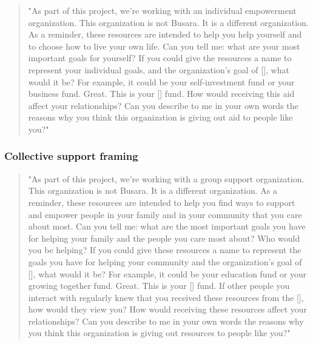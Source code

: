 \documentclass[11pt, a4paper]{article}\usepackage[]{graphicx}\usepackage[]{color}
\begin{document}
            \begin{quote}

                "As part of this project, we're working with an individual empowerment organization. This organization is not Busara. It is a different organization.
                As a reminder, these resources are intended to help you help yourself and to choose how to live your own life.
                Can you tell me: what are your most important goals for yourself?
                If you could give the resources a name to represent your individual goals, and the organization's goal of [], what would it be?  For example, it could be your self-investment fund or your business fund.
                Great. This is your [] fund.
                How would receiving this aid affect your relationships?
                Can you describe to me in your own words the reasons why you think this organization is giving out aid to people like you?"

            \end{quote}

        \subsubsection{Collective support framing}

            \begin{quote}

                "As part of this project, we're working with a group support organization. This organization is not Busara. It is a different organization.
                As a reminder, these resources are intended to help you find ways to support and empower people in your family and in your community that you care about most.
                Can you tell me: what are the most important goals you have for helping your family and the people you care most about? Who would you be helping?
                If you could give these resources a name to represent the goals you have for helping your community and the organization's goal of [], what would it be? For example, it could be your education fund or your growing together fund.
                Great. This is your [] fund.
                If other people you interact with regularly knew that you received these resources from the [], how would they view you?
                How would receiving these resources affect your relationships?
                Can you describe to me in your own words the reasons why you think this organization is giving out resources to people like you?"

            \end{quote}
\end{document}
